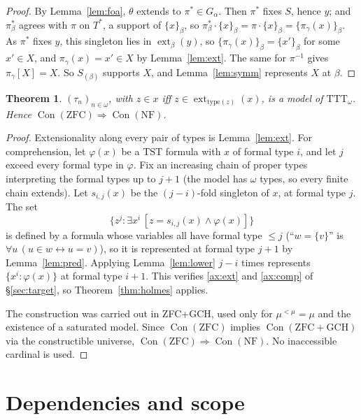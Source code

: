 \documentclass[11pt]{article}
\newtheorem{theorem}{Theorem}[section]
\theoremstyle{definition}
\theoremstyle{remark}
\newcommand{\NF}{\mathrm{NF}}
\newcommand{\TTT}{\mathrm{TTT}}
\newcommand{\TST}{\mathrm{TST}}
\newcommand{\ext}{\operatorname{ext}}
\newcommand{\Con}{\operatorname{Con}}
\begin{document}
\begin{proof}
By Lemma~\ref{lem:foa}, \(\theta\) extends to \(\pi^*\in G_\alpha\). Then
\(\pi^*\) fixes \(S\), hence \(y\); and \(\pi^*_\beta\) agrees with
\(\pi\) on \(T^*\), a support of \(\{x\}_\beta\), so
\(\pi^*_\beta\cdot\{x\}_\beta=\pi\cdot\{x\}_\beta=\{\pi_\gamma(x)\}_\beta\).
As \(\pi^*\) fixes \(y\), this singleton lies in \(\ext_\beta(y)\), so
\(\{\pi_\gamma(x)\}_\beta=\{x'\}_\beta\) for some \(x'\in X\), and
\(\pi_\gamma(x)=x'\in X\) by Lemma~\ref{lem:ext}. The same for
\(\pi^{-1}\) gives \(\pi_\gamma[X]=X\). So \(S_{(\beta)}\) supports \(X\),
and Lemma~\ref{lem:symm} represents \(X\) at \(\beta\).
\end{proof}

\begin{theorem}\label{thm:model}
\((\tau_n)_{n\in\omega}\), with \(z\in x\) iff \(z\in\ext_{\mathrm{type}
(z)}(x)\), is a model of \(\TTT_\omega\). Hence \(\Con(\mathrm{ZFC})
\Rightarrow\Con(\NF)\).
\end{theorem}
\begin{proof}
Extensionality along every pair of types is Lemma~\ref{lem:ext}. For
comprehension, let \(\varphi(x)\) be a \(\TST\) formula with \(x\) of
formal type \(i\), and let \(j\) exceed every formal type in \(\varphi\).
Fix an increasing chain of proper types interpreting the formal types up to
\(j+1\) (the model has \(\omega\) types, so every finite chain extends).
Let \(s_{i,j}(x)\) be the \((j-i)\)-fold singleton of \(x\), at formal type
\(j\). The set
\[
 \{z^{j}:\exists x^{i}\,[z=s_{i,j}(x)\wedge\varphi(x)]\}
\]
is defined by a formula whose variables all have formal type \(\leq j\)
(``\(w=\{v\}\)'' is \(\forall u\,(u\in w\leftrightarrow u=v)\)), so it is
represented at formal type \(j+1\) by Lemma~\ref{lem:pred}. Applying
Lemma~\ref{lem:lower} \(j-i\) times represents \(\{x^{i}:\varphi(x)\}\) at
formal type \(i+1\). This verifies \ref{ax:ext} and \ref{ax:comp} of
\S\ref{sec:target}, so Theorem~\ref{thm:holmes} applies.

The construction was carried out in ZFC+GCH, used only for
\(\mu^{<\mu}=\mu\) and the existence of a saturated model. Since
\(\Con(\mathrm{ZFC})\) implies \(\Con(\mathrm{ZFC+GCH})\) via the
constructible universe, \(\Con(\mathrm{ZFC})\Rightarrow\Con(\NF)\). No
inaccessible cardinal is used.
\end{proof}

\section{Dependencies and scope}\label{sec:status}
\end{document}
